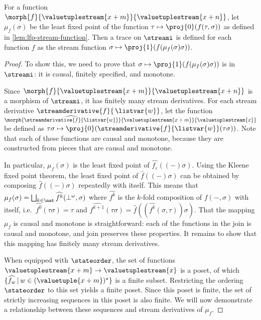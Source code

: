 \begin{theorem}
    For a function \(\morph{f}{\valuetuplestream{x+m}}{\valuetuplestream{x+n}}\),
    let \(\mu_f(\sigma)\) be the least fixed point of the function \(
    \tau \mapsto \proj{0}\mleft(f(\tau,\sigma)\mright)
    \) as defined in \cref{lem:lfp-stream-function}.
    Then a trace on \(\streami\) is defined for each function \(f\) as the
    stream function
    \(\sigma \mapsto \proj{1}\mleft(f(\mu_f(\sigma)\sigma)\mright)\).
\end{theorem}
\begin{proof}
    To show this, we need to prove that
    \(\sigma \mapsto \proj{1}\mleft(f(\mu_f(\sigma)\sigma)\mright)\) is in
    \(\streami\): it is causal, finitely specified, and monotone.

    Since \(
    \morph{f}{\valuetuplestream{x+m}}{\valuetuplestream{x+n}}
    \) is a morphism of \(\streami\), it has finitely many stream derivatives.
    For each stream derivative \(\streamderivative{f}{\,\listvar{w}}\), let the
    function \(
    \morph{
        \widehat{\streamderivative{f}{\listvar{w}}}
    }{
        \valuetuplestream{x+m}
    }{
        \valuetuplestream{x}
    }
    \) be defined as \(
    \tau\sigma
    \mapsto
    \proj{0}(\streamderivative{f}{\listvar{w}}(\tau\sigma))
    \).
    Note that each of these functions are causal and monotone, because they are
    constructed from pieces that are causal and monotone.

    In particular, \(\mu_f(\sigma)\) is the least fixed point of
    \(\widehat{f_\varepsilon}\left((-)\sigma\right)\).
    Using the Kleene fixed point theorem, the least fixed point of
    \(\widehat{f}((-)\sigma)\) can be obtained by composing
    \(\widehat{f}((-)\sigma)\) repeatedly with itself.
    This means that \(
    \mu_f(\sigma)
    =
    \bigsqcup_{k \in \nat} \widehat{f^k}(\bot^\omega,\sigma)
    \) where \(\widehat{f^k}\) is the \(k\)-fold composition of \(f(-,\sigma)\)
    with itself, i.e.\ \(\widehat{f^0}(\tau\sigma) = \tau\) and \(
    \widehat{f^{k+1}}(\tau\sigma)
    =
    \widehat{f}\left(\left(\widehat{f^{k}}(\sigma, \tau)\right)\sigma\right)
    \).
    That the mapping \(\mu_f\) is causal and monotone is
    straightforward: each of the functions in the join is causal and monotone,
    and join preserves these properties.
    It remains to show that this mapping has finitely many stream derivatives.

    When equipped with \(\stateorder\), the set of functions
    \(\valuetuplestream{x+m} \to \valuetuplestream{x}\)
    is a poset, of which
    \(\{\widehat{f_w} \,|\, w \in (\valuetuple{x+m})^\star\}\)
    is a finite subset.
    Restricting the ordering \(\stateorder\) to this set yields a finite poset.
    Since this poset is finite, the set of strictly increasing sequences in this
    poset is also finite.
    We will now demonstrate a relationship between these sequences and stream
    derivatives of \(\mu_f\).


\end{proof}
